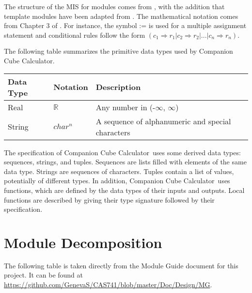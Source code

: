 \documentclass[12pt, titlepage]{article}
\newcommand{\progname}{Companion Cube Calculator}
\begin{document}
The structure of the MIS for modules comes from \citet{HoffmanAndStrooper1995},
with the addition that template modules have been adapted from
\cite{GhezziEtAl2003}.  The mathematical notation comes from Chapter 3 of
\citet{HoffmanAndStrooper1995}.  For instance, the symbol := is used for a
multiple assignment statement and conditional rules follow the form $(c_1
\Rightarrow r_1 | c_2 \Rightarrow r_2 | ... | c_n \Rightarrow r_n )$.

The following table summarizes the primitive data types used by \progname. 

\begin{center}
\renewcommand{\arraystretch}{1.2}
\noindent 
\begin{tabular}{l l p{7.5cm}} 
\toprule 
\textbf{Data Type} & \textbf{Notation} & \textbf{Description}\\ 
\midrule
Real & $\mathbb{R}$ & Any number in (-$\infty$, $\infty$)\\
\multirow{2}{1cm}{String} & \multirow{2}{1cm}{$char^n$} & A sequence of 
alphanumeric and special characters\\
\bottomrule
\end{tabular} 
\end{center}

\noindent
The specification of \progname \ uses some derived data types: sequences, strings, and
tuples. Sequences are lists filled with elements of the same data type. Strings
are sequences of characters. Tuples contain a list of values, potentially of
different types. In addition, \progname \ uses functions, which
are defined by the data types of their inputs and outputs. Local functions are
described by giving their type signature followed by their specification.

\section{Module Decomposition}

The following table is taken directly from the Module Guide document for this 
project. It can be found at 
\url{https://github.com/GenevaS/CAS741/blob/master/Doc/Design/MG}.
\end{document}
